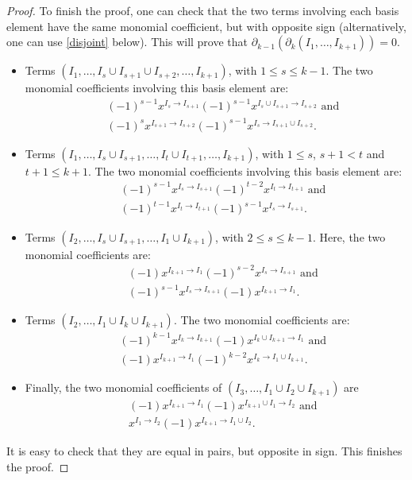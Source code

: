 \documentclass[ALCO]{cedram}
\newcommand{\dif}{\mbox{$\partial$}}
\begin{document}
\begin{proof}
To finish the proof, one can check that the two terms involving each
basis element have the same monomial coefficient, but with opposite
sign (alternatively, one can use \eqref{disjoint} below). This will
prove that $\dif_{k-1}(\dif_{k}(I_1,\ldots,I_{k+1}))=0$.
\begin{itemize}
\item Terms $(I_1,\ldots,I_s\cup I_{s+1}\cup I_{s+2},\ldots
  ,I_{k+1})$, with $1\leq s\leq k-1$. The two monomial coefficients
  involving this basis element are:
\begin{eqnarray*}
&& (-1)^{s-1}x^{I_{s}\to I_{s+1}}(-1)^{s-1}x^{I_{s}\cup I_{s+1}\to
    I_{s+2}}\mbox{ and }\\ && (-1)^{s}x^{I_{s+1}\to
    I_{s+2}}(-1)^{s-1}x^{I_{s}\to I_{s+1}\cup I_{s+2}}.
\end{eqnarray*}
\item Terms $(I_1,\ldots,I_s\cup I_{s+1},\ldots ,I_{t}\cup
  I_{t+1},\ldots,I_{k+1})$, with $1\leq s$, $s+1<t$ and $t+1\leq k+1$.
  The two monomial coefficients involving this basis element are:
\begin{eqnarray*}
&& (-1)^{s-1}x^{I_{s}\to I_{s+1}}(-1)^{t-2}x^{I_{t}\to
    I_{t+1}}\mbox{ and }\\ && (-1)^{t-1}x^{I_{t}\to I_{t+1}}(-1)^{s-1}x^{I_{s}\to
    I_{s+1}}.
\end{eqnarray*}
\item Terms $(I_2,\ldots ,I_s\cup I_{s+1},\ldots ,I_1\cup I_{k+1})$,
  with $2\leq s\leq k-1$. Here, the two monomial coefficients are:
\begin{eqnarray*}
&& (-1)x^{I_{k+1}\to I_1}(-1)^{s-2}x^{I_s\to I_{s+1}}\mbox{ and }\\ &&
  (-1)^{s-1}x^{I_s\to I_{s+1}}(-1)x^{I_{k+1}\to I_{1}}.
\end{eqnarray*}
\item Terms $(I_2,\ldots ,I_1\cup I_{k}\cup I_{k+1})$. The two
  monomial coefficients are:
\begin{eqnarray*}
&& (-1)^{k-1}x^{I_k\to I_{k+1}}(-1)x^{I_{k}\cup I_{k+1}\to I_1}\mbox{ and }
\\ && (-1)x^{I_{k+1}\to
    I_1}(-1)^{k-2}x^{I_{k}\to I_1\cup I_{k+1}}. 
\end{eqnarray*}
\item Finally, the two monomial coefficients of $(I_3,\ldots ,I_1\cup
I_2\cup I_{k+1})$ are 
\begin{eqnarray*}
&& (-1)x^{I_{k+1}\to I_1}(-1)x^{I_{k+1}\cup I_1\to I_2}\mbox{ and }\\ && 
x^{I_1\to I_2}(-1)x^{I_{k+1}\to I_1\cup I_2}.
\end{eqnarray*}
\end{itemize}
It is easy to check that they are equal in pairs, but opposite in
sign. This finishes the proof.
\end{proof}
\end{document}
